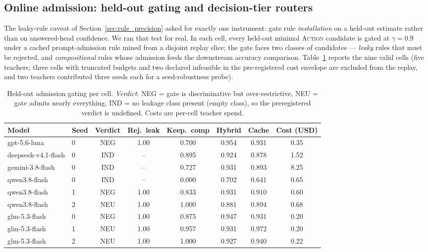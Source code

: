 \documentclass[11pt]{article}
\theoremstyle{plain}
\begin{document}
\subsection{Online admission: held-out gating and decision-tier routers}
\label{sec:admission}
The leaky-rule caveat of Section~\ref{sec:rule_precision} asked for exactly one
instrument: gate rule \emph{installation} on a held-out estimate rather than on
answered-head confidence. We ran that test for real. In each cell, every held-out
minimal \textsc{Action} candidate is gated at $\gamma=0.9$ under a cached
prompt-admission rule mined from a disjoint replay slice; the gate faces two
classes of candidates --- \emph{leaky} rules that must be rejected, and
\emph{compositional} rules whose admission feeds the downstream accuracy
comparison. Table~\ref{tab:admission} reports the nine valid cells (five
teachers; three cells with truncated budgets and two declared infeasible in the
pre-registered cost envelope are excluded from the replay, and two teachers contributed three
seeds each for a seed-robustness probe).

\begin{table}[t]
\centering
\caption{Held-out admission gating per cell. \emph{Verdict}: NEG = gate is
discriminative but over-restrictive, NEU = gate admits nearly everything,
IND = no leakage class present (empty class), so the preregistered verdict is
undefined. Costs are per-cell teacher spend.}
\label{tab:admission}
\begin{tabular}{llcccccc}
\toprule
Model & Seed & Verdict & Rej.\ leak & Keep.\ comp & Hybrid & Cache & Cost (USD)\\
\midrule
gpt-5.6-luna & 0 & NEG & 1.00 & 0.700 & 0.954 & 0.931 & 0.35\\
deepseek-v4.1-flash & 0 & IND & -- & 0.895 & 0.924 & 0.878 & 1.52\\
gemini-3.8-flash & 0 & IND & -- & 0.727 & 0.931 & 0.893 & 8.25\\
qwen3.8-flash & 0 & IND & -- & 0.000 & 0.702 & 0.641 & 0.65\\
qwen3.8-flash & 1 & NEG & 1.00 & 0.833 & 0.931 & 0.910 & 0.60\\
qwen3.8-flash & 2 & NEU & 1.00 & 1.000 & 0.881 & 0.894 & 0.68\\
glm-5.3-flash & 0 & NEG & 1.00 & 0.875 & 0.947 & 0.931 & 0.20\\
glm-5.3-flash & 1 & NEU & 1.00 & 0.957 & 0.931 & 0.972 & 0.20\\
glm-5.3-flash & 2 & NEU & 1.00 & 1.000 & 0.927 & 0.940 & 0.22\\
\bottomrule
\end{tabular}

\end{table}
\end{document}
